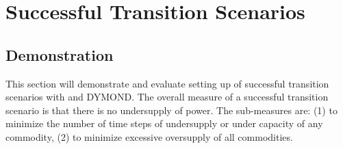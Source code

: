 \chapter{Successful Transition Scenarios}

\section{Demonstration}
This section will demonstrate and evaluate 
setting up of successful transition scenarios 
with \Cyclus and DYMOND. 
The overall measure of a successful transition scenario  
is that there is no undersupply of power. 
The sub-measures are: 
(1) to minimize the number of time 
steps of undersupply or under capacity of any 
commodity, 
(2) to minimize excessive oversupply of all commodities.


